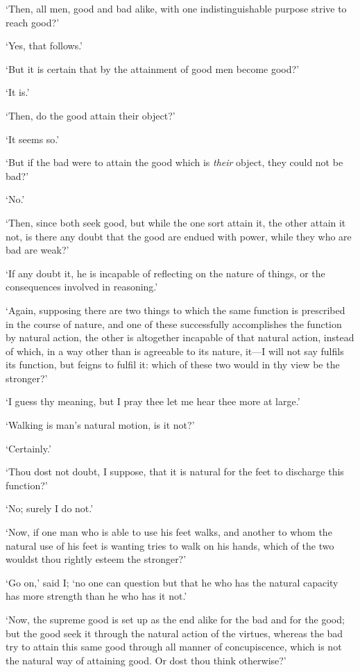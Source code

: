 \documentclass[11pt]{book}
\begin{document}
`Then, all men, good and bad alike, with one indistinguishable purpose
strive to reach good?'

`Yes, that follows.'

`But it is certain that by the attainment of good men become good?'

`It is.'

`Then, do the good attain their object?'

`It seems so.'

`But if the bad were to attain the good which is \emph{their} object, they
could not be bad?'

`No.'

`Then, since both seek good, but while the one sort attain it, the other
attain it not, is there any doubt that the good are endued with power,
while they who are bad are weak?'

`If any doubt it, he is incapable of reflecting on the nature of things,
or the consequences involved in reasoning.'

`Again, supposing there are two things to which the same function is
prescribed in the course of nature, and one of these successfully
accomplishes the function by natural action, the other is altogether
incapable of that natural action, instead of which, in a way other than
is agreeable to its nature, it---I will not say fulfils its function, but
feigns to fulfil it: which of these two would in thy view be the
stronger?'

`I guess thy meaning, but I pray thee let me hear thee more at large.'

`Walking is man's natural motion, is it not?'

`Certainly.'

`Thou dost not doubt, I suppose, that it is natural for the feet to
discharge this function?'

`No; surely I do not.'

`Now, if one man who is able to use his feet walks, and another to whom
the natural use of his feet is wanting tries to walk on his hands,
which of the two wouldst thou rightly esteem the stronger?'

`Go on,' said I; `no one can question but that he who has the natural
capacity has more strength than he who has it not.'

`Now, the supreme good is set up as the end alike for the bad and for
the good; but the good seek it through the natural action of the
virtues, whereas the bad try to attain this same good through all manner
of concupiscence, which is not the natural way of attaining good. Or
dost thou think otherwise?'
\end{document}
